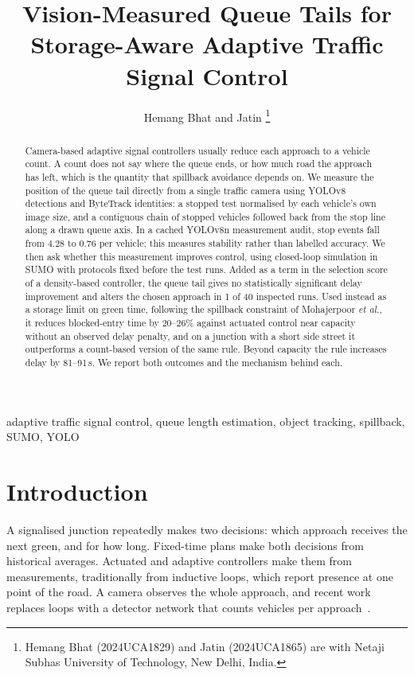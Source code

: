 \documentclass[journal]{IEEEtran}
\begin{document}
\title{Vision-Measured Queue Tails for Storage-Aware Adaptive Traffic Signal Control}

\author{Hemang Bhat and Jatin%
\thanks{Hemang Bhat (2024UCA1829) and Jatin (2024UCA1865) are with Netaji Subhas University of Technology, New Delhi, India.}}

\maketitle

\begin{abstract}
Camera-based adaptive signal controllers usually reduce each approach to a vehicle
count. A count does not say where the queue ends, or how much road the approach has
left, which is the quantity that spillback avoidance depends on. We measure the
position of the queue tail directly from a single traffic camera using YOLOv8
detections and ByteTrack identities: a stopped test normalised by each vehicle's own
image size, and a contiguous chain of stopped vehicles followed back from the stop
line along a drawn queue axis. In a cached YOLOv8n measurement audit, stop events fall from 4.28 to 0.76 per vehicle; this measures stability rather than labelled accuracy. We then ask whether this measurement improves control,
using closed-loop simulation in SUMO with protocols fixed before the test runs. Added
as a term in the selection score of a density-based controller, the queue tail gives no statistically significant delay improvement and alters the chosen approach in 1 of 40 inspected runs. Used instead as a storage limit on green time, following the spillback constraint
of Mohajerpoor \emph{et al.}, it reduces blocked-entry time by 20--26\% against actuated
control near capacity without an observed delay penalty, and on a junction with a
short side street it outperforms a count-based version of the same rule. Beyond
capacity the rule increases delay by 81--91\,s. We report both outcomes and the
mechanism behind each.
\end{abstract}

\begin{IEEEkeywords}
adaptive traffic signal control, queue length estimation, object tracking, spillback,
SUMO, YOLO
\end{IEEEkeywords}

\section{Introduction}
A signalised junction repeatedly makes two decisions: which approach receives the next
green, and for how long. Fixed-time plans make both decisions from historical averages.
Actuated and adaptive controllers make them from measurements, traditionally from
inductive loops, which report presence at one point of the road. A camera observes the
whole approach, and recent work replaces loops with a detector network that counts
vehicles per approach~\cite{raza2025}.
\end{document}
